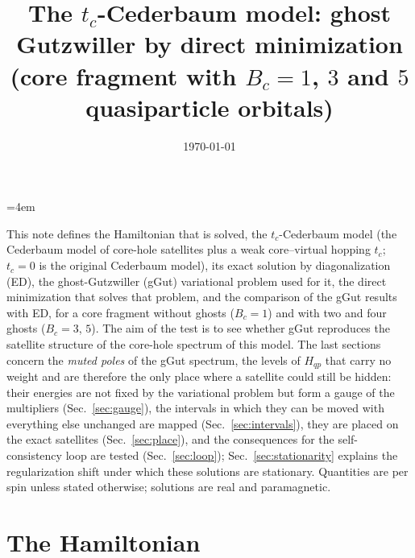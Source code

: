 \documentclass[11pt]{article}
\title{The $t_c$-Cederbaum model: ghost Gutzwiller by direct minimization\\
\large (core fragment with $B_c=1$, $3$ and $5$ quasiparticle orbitals)}
\author{}
\date{\today}
\begin{document}
\emergencystretch=4em
\maketitle

\noindent This note defines the Hamiltonian that is solved, the $t_c$-Cederbaum model (the Cederbaum model of core-hole satellites plus a weak
core--virtual hopping $t_c$; $t_c=0$ is the original Cederbaum model), its exact solution by diagonalization (ED), the
ghost-Gutzwiller (gGut) variational problem used for it, the direct minimization that solves that problem, and the
comparison of the gGut results with ED, for a core fragment without ghosts ($B_c=1$) and with two and four ghosts
($B_c=3$, $5$). The aim of the test is to see whether gGut reproduces the satellite structure of the core-hole spectrum of this model.
The last sections concern the \emph{muted poles} of the gGut spectrum, the levels of $H_{qp}$ that carry no weight and are therefore the only place where a satellite could still be hidden: their energies are not fixed by the variational problem but form a gauge of the multipliers (Sec.~\ref{sec:gauge}),
the intervals in which they can be moved with everything else unchanged are mapped (Sec.~\ref{sec:intervals}), they are placed on the exact satellites (Sec.~\ref{sec:place}), and the consequences for the self-consistency loop are tested (Sec.~\ref{sec:loop}); Sec.~\ref{sec:stationarity} explains the regularization shift under which these solutions are stationary.
Quantities are per spin unless stated otherwise; solutions are real and paramagnetic.

\section{The Hamiltonian}
\label{sec:H}
\end{document}
